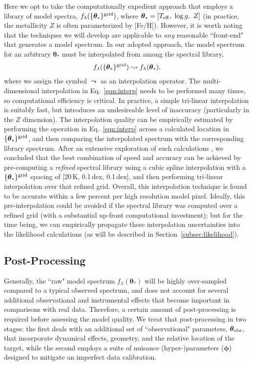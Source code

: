 \documentclass[iop,floatfix]{emulateapj}
\newcommand{\flam}{f_\lambda}
\newcommand{\vt}{ {\bm \theta}}
\newcommand{\vp}{ {\bm \phi}}
\begin{document}
Here we opt to take the computationally expedient approach that employs a library of model spectra, 
$\flam(\{\vt_{\ast}\}^{\rm grid})$, where $\vt_{\ast} = [T_{\rm eff}, \,\, \log{g}, \,\, Z]$ 
(in practice, the metallicity $Z$ is often parameterized by [Fe/H]).  However, it is worth noting 
that the techniques we will develop are applicable to {\it any} reasonable ``front-end" that 
generates a model spectrum.  In our adopted approach, the model spectrum for an arbitrary 
$\vt_{\ast}$ must be interpolated from among the spectral library, 
\begin{equation}
\flam(\{\vt_{\ast}\}^{\rm grid}) \leadsto \flam(\vt_{\ast}),
\label{eqn:interp}
\end{equation}
where we assign the symbol $\leadsto$ as an interpolation operator.  The multi-dimensional 
interpolation in Eq.~\ref{eqn:interp} needs to be performed many times, so computational efficiency 
is critical.  In practice, a simple tri-linear interpolation is suitably fast, but introduces an 
undesireable level of inaccuracy (particularly in the $Z$ dimension).  The interpolation quality 
can be empirically estimated by performing the operation in Eq.~\ref{eqn:interp} across a 
calculated location in $\{\vt_{\ast}\}^{\rm grid}$, and then comparing the interpolated spectrum 
with the corresponding library spectrum.  After an extensive exploration of such calculations 
\citep[see also][]{husser12}, we concluded that the best combination of speed and accuracy can be 
achieved by pre-computing a {\it refined} spectral library using a cubic spline interpolation with 
a $\{\vt_{\ast}\}^{\rm grid}$ spacing of [20\,K, 0.1\,dex, 0.1\,dex], and then performing 
tri-linear interpolation over that refined grid.  Overall, this interpolation technique is found to 
be accurate within a few percent per high resolution model pixel.  Ideally, this pre-interpolation 
could be avoided if the spectral library was computed over a refined grid (with a substantial 
up-front computational investment); but for the time being, we can empirically propagate these 
interpolation uncertainties into the likelihood calculations (as will be described in 
Section~\ref{subsec:likelihood}).  


\subsection{Post-Processing} \label{subsec:postprocess}

Generally, the ``raw" model spectrum $\flam(\vt_{\ast})$ will be highly over-sampled compared to a 
typical observed spectrum, and does not account for several additional observational and 
instrumental effects that become important in comparisons with real data.  Therefore, a certain 
amount of post-processing is required before assessing the model quality.  We treat that 
post-processing in two stages: the first deals with an additional set of ``observational" 
parameters, $\vt_{\rm obs}$, that incorporate dynamical effects, geometry, and the relative 
location of the target, while the second employs a suite of nuisance (hyper-)parameters ($\vp$) 
designed to mitigate an imperfect data calibration.
\end{document}
